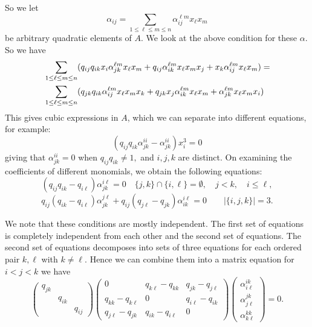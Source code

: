 \documentclass{amsart}
\begin{document}
So we let
$$\alpha_{ij} = \sum_{1 \leq \ell \leq m \leq n} \alpha_{ij}^{\ell m} x_\ell x_m$$
be arbitrary quadratic elements of $A$.  We look at the above condition for these $\alpha$.
So we have \begin{align}\label{eq:deformation}
    & \sum_{1 \leq \ell \leq m \leq n}(q_{ij}q_{ik}x_i\alpha_{jk}^{\ell m} x_\ell x_m+q_{ij}\alpha_{ik}^{\ell m} x_\ell x_mx_j+x_k\alpha_{ij}^{\ell m} x_\ell x_m) = \notag \\
    & \sum_{1 \leq \ell \leq m \leq n}( q_{jk}q_{ik} \alpha_{ij}^{\ell m} x_\ell x_mx_k + q_{jk}x_j\alpha_{ik}^{\ell m} x_\ell x_m +\alpha_{jk}^{\ell m} x_\ell x_mx_i) 
\end{align}
This gives cubic expressions in $A$, which we can separate into different equations, for example:
$$(q_{ij} q_{ik} \alpha_{jk}^{ii} -\alpha_{jk}^{ii}) x_i^3 = 0$$
giving that $\alpha_{jk}^{ii} =0$ when $q_{ij} q_{ik} \neq 1,$ and $i,j,k$ are distinct.
On examining the coefficients of different monomials, we obtain the following
equations:
$$ (q_{ij}q_{ik}-q_{i\ell})\alpha_{jk}^{i\ell} = 0 \quad  \{ j,k \} \cap \{i,\ell\} = \emptyset, \quad  j<k, \quad i \leq \ell,$$
  $$ q_{ij}(q_{ik}-q_{i\ell}) \alpha_{jk}^{j\ell} + q_{ij}(q_{j\ell}-q_{jk}) \alpha_{ik}^{i\ell} = 0 \quad \quad |\{ i,j,k \}| =3.$$


We note that these conditions are mostly independent.  The first set of equations is completely independent from each other and the second set of equations.
The second set of equations decomposes into sets of three equations
for each ordered pair $k,\ell$ with $k \neq \ell.$
Hence we can combine them into a matrix equation for $i<j<k$ we have
$$\begin{pmatrix}
  q_{jk} & & \\
    & q_{ik} & \\
    & & q_{ij}
\end{pmatrix}
\begin{pmatrix}
  0 & q_{k \ell}-q_{kk} & q_{jk} - q_{j\ell} \\
  q_{kk} - q_{k \ell} & 0 & q_{i\ell} - q_{ik} \\
  q_{j\ell} - q_{jk} & q_{ik} - q_{i\ell} & 0
\end{pmatrix}
\begin{pmatrix}
  \alpha^{ik}_{i\ell} \\ \alpha^{jk}_{j\ell} \\  \alpha^{kk}_{k\ell}
  \end{pmatrix} = 0.
$$
\end{document}
